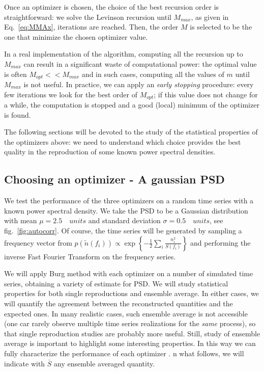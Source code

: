 \documentclass[twocolumn,showpacs,preprintnumbers,nofootinbib,prd,
superscriptaddress,10pt]{revtex4-1}
\begin{document}
Once an optimizer is chosen, the choice of the best recursion order is straightforward: we solve the Levinson recursion until $M_{max}$, as given in Eq.~\ref{eq:MMAx}, iterations are reached. Then, the order $M$ is selected to be the one that minimize the chosen optimizer value.

In a real implementation of the algorithm, computing all the recursion up to $M_{max}$ can result in a significant waste of computational power: the optimal value is often $M_{opt}<< M_{max}$ and in such cases, computing all the values of $m$ until $M_{max}$ is not useful.
In practice, we can apply an \textit{early stopping} procedure: every few iterations we look for the best order of $M_{opt}$; if this value does not change for a while, the computation is stopped and a good (local) minimum of the optimizer is found.

The following sections will be devoted to the study of the statistical properties of the optimizers above: we need to understand which choice provides the best quality in the reproduction of some known power spectral densities. 

\subsection{Choosing an optimizer - A gaussian PSD} \label{sec:arp_validation}
We test the performance of the three optimizers on a random time series with a known power spectral density.
We take the PSD to be a Gaussian distribution with mean $\mu = 2.5 \quad units$ and standard deviation $\sigma = 0.5 \quad units$, see fig.~\ref{fig:autocorr}.
Of course, the time series will be generated by sampling a frequency vector from ${p(\tilde{n}(f_i)) \propto \exp{\left\{-\frac{1}{2}\sum_i\frac{n_i ^2}{S(f_i)}\right\}}}$ and performing the inverse Fast Fourier Transform on the frequency series.

We will apply Burg method with each optimizer on a number of simulated time series, obtaining a variety of estimate for PSD.
We will study statistical properties for both single reproductions and ensemble average. In either cases, we will quantify the agreement between the reconstructed quantities and the expected ones.
In many realistic cases, such ensemble average is not accessible (one car rarely observe multiple time series realizations for the \textit{same} process), so that single reproduction studies are probably more useful. Still, study of ensemble average is important to highlight some interesting properties. In this way we can fully characterize the performance of each optimizer .
n what follows, we will indicate with $\bar S$ any ensemble averaged quantity.
\end{document}
